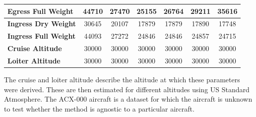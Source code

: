 \begin{table}[H]
{\begin{tabular}{|l|c|c|c|c|c|c|}
\textbf{Egress Full Weight}  & 44710          & 27470          & 25155            & 26764            & 29211            & 35616            \\ \hline
\textbf{Ingress Dry Weight}  & 30645          & 20107          & 17879            & 17879            & 17890            & 17748            \\ \hline
\textbf{Ingress Full Weight} & 44093          & 27272          & 24846            & 24846            & 24857            & 24715            \\ \hline
\textbf{Cruise Altitude}     & 30000          & 30000          & 30000            & 30000            & 30000            & 30000            \\ \hline
\textbf{Loiter Altitude}     & 30000          & 30000          & 30000            & 30000            & 30000            & 30000            \\ \hline
\end{tabular}
}
\end{table}
The cruise and loiter altitude describe the altitude at which these parameters were derived. These are then estimated for different altitudes using US Standard Atmosphere. The ACX-000 aircraft is a dataset for which the aircraft is unknown to test whether the method is agnostic to a particular aircraft.

